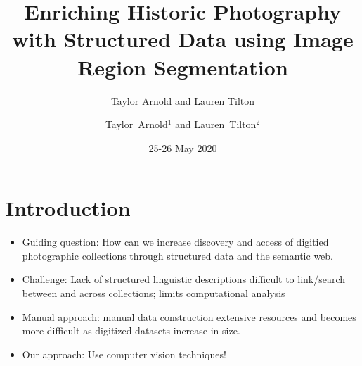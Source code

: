 \documentclass[12pt,ignorenonframetext,aspectratio=169]{beamer}
\title{Enriching Historic Photography with Structured Data
using Image Region Segmentation}
\author{Taylor Arnold and Lauren Tilton}
\date{25-26 May 2020}
\author %
{Taylor~Arnold$^{1}$ and Lauren~Tilton$^{2}$}
\institute[] %
{
  $^{1}$ Assistant Professor of Statistics and Linguistics\\
  University of Richmond\\
  \texttt{statsmaths.github.io}\\

  $^{2}$ Assistant Professor of Digital Humanities\\
  University of Richmond\\
  \texttt{laurentilon.com}\\

}
\makeatletter
\newcommand{\orange}[1]{\textcolor{solarized@orange}{#1}}
\newcommand{\blue}[1]{\textcolor{solarized@blue}{#1}}
\makeatother
\begin{document}



\frame{\titlepage}

%
%
%

\section{Introduction}

\begin{frame}{}

\begin{itemize}
\item \blue{Guiding question}: How can we increase discovery and access of digitied
photographic collections through structured data and the semantic web. \pause
\item \blue{Challenge}: Lack of structured linguistic descriptions \textrightarrow{}
difficult to link/search between and across collections; limits computational analysis \pause
\item \blue{Manual approach}: manual data construction \textrightarrow{}
extensive resources and becomes more difficult as digitized
datasets increase in size. \pause
\item \blue{Our approach}: Use computer vision techniques!
\end{itemize}

\end{frame}
\end{document}
